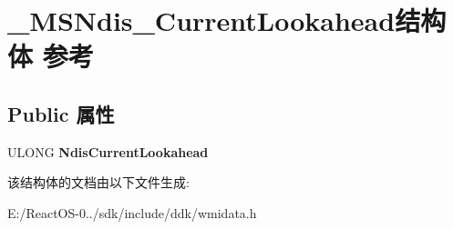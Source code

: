 \hypertarget{struct___m_s_ndis___current_lookahead}{}\section{\+\_\+\+M\+S\+Ndis\+\_\+\+Current\+Lookahead结构体 参考}
\label{struct___m_s_ndis___current_lookahead}
\subsection*{Public 属性}
\begin{DoxyCompactItemize}
\item 
\mbox{\label{struct___m_s_ndis___current_lookahead_aa9bfbb1b06089bf0ab67c7c8aeb8cce1}} 
U\+L\+O\+NG {\bfseries Ndis\+Current\+Lookahead}
\end{DoxyCompactItemize}


该结构体的文档由以下文件生成\+:\begin{DoxyCompactItemize}
\item 
E\+:/\+React\+O\+S-\/0../sdk/include/ddk/wmidata.\+h\end{DoxyCompactItemize}
